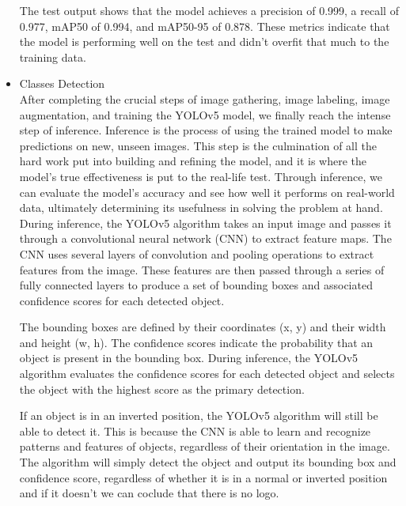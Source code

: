 \begin{itemize}
\begin{table}[h]
\end{table}

\FloatBarrier
The test output shows that the model achieves a precision of 0.999, a recall of 0.977, mAP50 of 0.994, and mAP50-95 of 0.878. These metrics indicate that the model is performing well on the test and didn't overfit that much to the training data.

\item{Classes Detection}\\
After completing the crucial steps of image gathering, image labeling, image augmentation, and training the YOLOv5 model, we finally reach the intense step of inference. Inference is the process of using the trained model to make predictions on new, unseen images. This step is the culmination of all the hard work put into building and refining the model, and it is where the model's true effectiveness is put to the real-life test. Through inference, we can evaluate the model's accuracy and see how well it performs on real-world data, ultimately determining its usefulness in solving the problem at hand.\\
During inference, the YOLOv5 algorithm takes an input image and passes it through a convolutional neural network (CNN) to extract feature maps. The CNN uses several layers of convolution and pooling operations to extract features from the image. These features are then passed through a series of fully connected layers to produce a set of bounding boxes and associated confidence scores for each detected object.

The bounding boxes are defined by their coordinates (x, y) and their width and height (w, h). The confidence scores indicate the probability that an object is present in the bounding box. During inference, the YOLOv5 algorithm evaluates the confidence scores for each detected object and selects the object with the highest score as the primary detection.

If an object is in an inverted position, the YOLOv5 algorithm will still be able to detect it. This is because the CNN is able to learn and recognize patterns and features of objects, regardless of their orientation in the image. The algorithm will simply detect the object and output its bounding box and confidence score, regardless of whether it is in a normal or inverted position and if it doesn't we can coclude that there is no logo.


\end{itemize}
